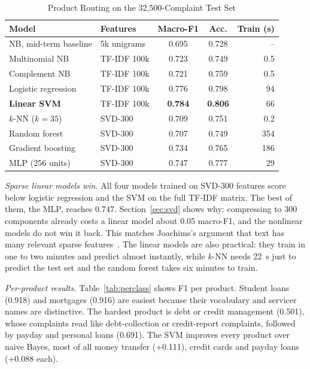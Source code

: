 \documentclass[conference]{IEEEtran}
\begin{document}
\begin{table}[!t]
\caption{Product Routing on the 32,500-Complaint Test Set}
\label{tab:results}
\centering
\footnotesize
\setlength{\tabcolsep}{3.5pt}
\begin{tabular}{@{}llccr@{}}
\toprule
Model & Features & Macro-F1 & Acc. & Train (s) \\
\midrule
NB, mid-term baseline & 5k unigrams & 0.695 & 0.728 & -- \\
\midrule
Multinomial NB & TF-IDF 100k & 0.723 & 0.749 & 0.5 \\
Complement NB & TF-IDF 100k & 0.721 & 0.759 & 0.5 \\
Logistic regression & TF-IDF 100k & 0.776 & 0.798 & 94 \\
\textbf{Linear SVM} & TF-IDF 100k & \textbf{0.784} & \textbf{0.806} & 66 \\
\midrule
$k$-NN ($k=35$) & SVD-300 & 0.709 & 0.751 & 0.2 \\
Random forest & SVD-300 & 0.707 & 0.749 & 354 \\
Gradient boosting & SVD-300 & 0.734 & 0.765 & 186 \\
MLP (256 units) & SVD-300 & 0.747 & 0.777 & 29 \\
\bottomrule
\end{tabular}
\end{table}

\textit{Sparse linear models win.} All four models trained on SVD-300 features score below logistic regression and the SVM on the full TF-IDF matrix. The best of them, the MLP, reaches 0.747. Section~\ref{sec:svd} shows why: compressing to 300 components already costs a linear model about 0.05 macro-F1, and the nonlinear models do not win it back. This matches Joachims's argument that text has many relevant sparse features~\cite{joachims}. The linear models are also practical: they train in one to two minutes and predict almost instantly, while $k$-NN needs 22~s just to predict the test set and the random forest takes six minutes to train.

\textit{Per-product results.} Table~\ref{tab:perclass} shows F1 per product. Student loans (0.918) and mortgages (0.916) are easiest because their vocabulary and servicer names are distinctive. The hardest product is debt or credit management (0.501), whose complaints read like debt-collection or credit-report complaints, followed by payday and personal loans (0.691). The SVM improves every product over naive Bayes, most of all money transfer (+0.111), credit cards and payday loans (+0.088 each).
\end{document}
